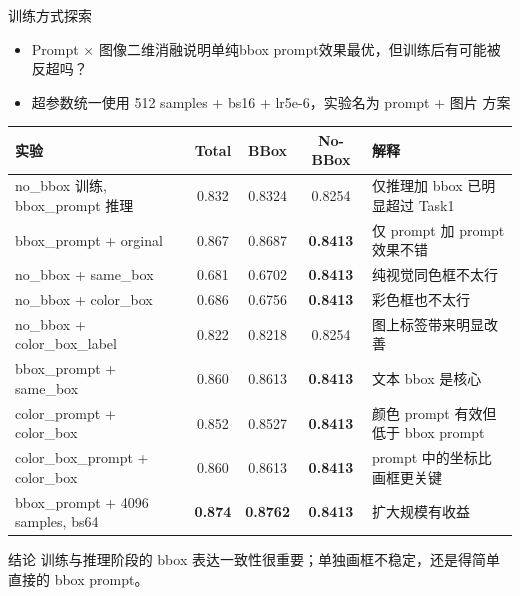 \documentclass{beamer}
\begin{document}
\begin{frame}[shrink=8]{训练方式探索}
\small
\begin{itemize}
\item Prompt × 图像二维消融说明单纯bbox prompt效果最优，但训练后有可能被反超吗？
\item 超参数统一使用 512 samples + bs16 + lr5e-6，实验名为 prompt + 图片 方案
\end{itemize}
\vspace{0.15em}
\scriptsize
\centering 
\begin{tabular}{p{}cccp{}}
\toprule
实验 & Total & BBox & No-BBox & 解释 \\
\midrule
no\_bbox 训练, bbox\_prompt 推理 & 0.832 & 0.8324 & 0.8254 & 仅推理加 bbox 已明显超过 Task1 \\
bbox\_prompt + orginal & 0.867 & 0.8687 & \textbf{0.8413} & 仅 prompt 加 prompt 效果不错 \\
no\_bbox + same\_box & 0.681 & 0.6702 & \textbf{0.8413} & 纯视觉同色框不太行 \\
no\_bbox + color\_box & 0.686 & 0.6756 & \textbf{0.8413} & 彩色框也不太行 \\
no\_bbox + color\_box\_label & 0.822 & 0.8218 & 0.8254 & 图上标签带来明显改善 \\
bbox\_prompt + same\_box & 0.860 & 0.8613 & \textbf{0.8413} & 文本 bbox 是核心 \\
color\_prompt + color\_box & 0.852 & 0.8527 & \textbf{0.8413} & 颜色 prompt 有效但低于 bbox prompt \\
color\_box\_prompt + color\_box & 0.860 & 0.8613 & \textbf{0.8413} & prompt 中的坐标比画框更关键 \\
bbox\_prompt + 4096 samples, bs64 & \textbf{0.874} & \textbf{0.8762} & \textbf{0.8413} & 扩大规模有收益 \\
\bottomrule
\end{tabular}
\vspace{0.4em}
\begin{block}{结论}
训练与推理阶段的 bbox 表达一致性很重要；单独画框不稳定，还是得简单直接的 bbox prompt。
\end{block}
\end{frame}
\end{document}
